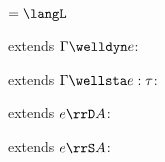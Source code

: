\begin{flushleft}

 $= \langL$\\

\medskip
\begin{minipage}[t]{0.5\textwidth}
 extends $\Gamma \welldyn e$:
\begin{mathpar}
\end{mathpar}
\end{minipage}%
\begin{minipage}[t]{0.5\textwidth}
 extends $\Gamma \wellsta e : \tau$:
\begin{mathpar}
\end{mathpar}
\end{minipage}

\medskip
\begin{minipage}[t]{0.5\textwidth}
 extends $e \rrD A$:
\begin{mathpar}



\end{mathpar}
\end{minipage}%
\begin{minipage}[t]{0.5\textwidth}
 extends $e \rrS A$:
\begin{mathpar}


\end{mathpar}
\end{minipage}
\end{flushleft}
